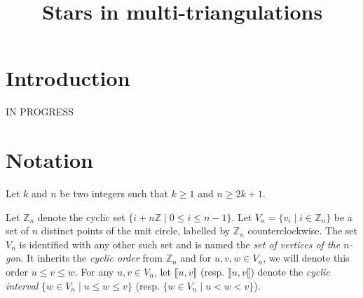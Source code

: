 \documentclass[12pt]{amsart}
\begin{document}
 

\newtheorem{theorem}{Theorem}
\newtheorem{proposition}{Proposition}
\newtheorem{lemma}{Lemma}
\newtheorem{corollary}{Corollary}
\newtheorem{definition}{Definition}
\newenvironment{remark}{\medskip\noindent{\textbf{Remark.}}}{\medskip}
\newenvironment{bibremark}{\begin{footnotesize}\medskip\noindent{\textbf{Bibliographic remark.}}}{\end{footnotesize}\medskip}

\makeatletter
\newlength{\earraycolsep}
\setlength{\earraycolsep}{2pt}
\def\eqnarray{\stepcounter{equation}\let\@currentlabel%
\theequation
\global\@eqnswtrue\m@th
\global\@eqcnt\z@\tabskip\@centering\let\\\@eqncr
$$\halign to\displaywidth\bgroup\@eqnsel\hskip\@centering
$\displaystyle\tabskip\z@{##}$&\global\@eqcnt\@ne
\hskip 2\earraycolsep \hfil$\displaystyle{##}$\hfil
&\global\@eqcnt\tw@ \hskip 2\earraycolsep
$\displaystyle\tabskip\z@{##}$\hfil
\tabskip\@centering&\llap{##}\tabskip\z@\cr}
\makeatother

\title{Stars in multi-triangulations}

\begin{abstract}
\end{abstract}

\maketitle

\section{Introduction}

IN PROGRESS





\section{Notation}

Let $k$ and $n$ be two integers such that $k\ge 1$ and $n\ge 2k+1$.

Let $\mathbb{Z}_n$ denote the cyclic set $\{i+n\mathbb{Z}\;|\; 0\le i\le n-1\}$.
Let $V_n=\{v_i\;|\; i\in\mathbb{Z}_n\}$ be a set of $n$ distinct points of the unit circle, labelled by $\mathbb{Z}_n$ counterclockwise.
The set $V_n$ is identified with any other such set and is named the \emph{set of vertices of the $n$-gon}.
It inherits the \emph{cyclic order} from $\mathbb{Z}_n$ and for $u,v,w\in V_n$, we will denote this order $u
\le v\le w$.
For any $u,v\in V_n$, let $\llbracket u,v\rrbracket$ (resp. $\rrbracket u,v\llbracket$) denote the \emph{cyclic interval} $\{w\in V_n\;|\; u\le w\le v\}$ (resp. $\{w\in V_n\;|\; u<w<v\}$).
\end{document}
